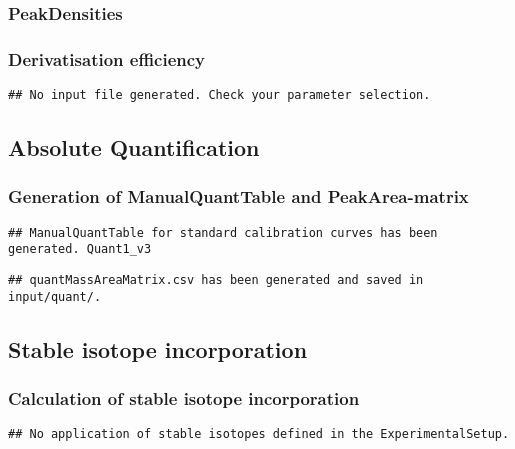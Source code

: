 \documentclass[9pt,]{article}
\begin{document}
\subsubsection{PeakDensities}\label{peakdensities}

\subsubsection{Derivatisation
efficiency}\label{derivatisation-efficiency}

\begin{verbatim}
## No input file generated. Check your parameter selection.
\end{verbatim}

\subsection{Absolute Quantification}\label{absolute-quantification}

\subsubsection{Generation of ManualQuantTable and
PeakArea-matrix}\label{generation-of-manualquanttable-and-peakarea-matrix}

\begin{verbatim}
## ManualQuantTable for standard calibration curves has been generated. Quant1_v3
\end{verbatim}

\begin{verbatim}
## quantMassAreaMatrix.csv has been generated and saved in input/quant/.
\end{verbatim}

\subsection{Stable isotope
incorporation}\label{stable-isotope-incorporation}

\subsubsection{Calculation of stable isotope
incorporation}\label{calculation-of-stable-isotope-incorporation}

\begin{verbatim}
## No application of stable isotopes defined in the ExperimentalSetup.
\end{verbatim}
\end{document}
